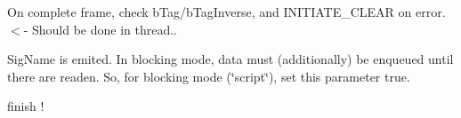 \begin{DoxyRefList}
\item[\label{todo__todo000042}%
\hypertarget{todo__todo000042}{}%
Member \hyperlink{classmdt_usbtmc_port_manager_aca42b343ae1f6a324e6e45968f03bbea}{mdt\-Usbtmc\-Port\-Manager\-:\-:from\-Thread\-New\-Frame\-Readen} ()]On complete frame, check b\-Tag/b\-Tag\-Inverse, and I\-N\-I\-T\-I\-A\-T\-E\-\_\-\-C\-L\-E\-A\-R on error. $<$-\/ Should be done in thread..  
\item[\label{todo__todo000043}%
\hypertarget{todo__todo000043}{}%
Member \hyperlink{classmdt_usbtmc_port_manager_ab1604a1c8f2e9192714d039dbf9a5158}{mdt\-Usbtmc\-Port\-Manager\-:\-:send\-Read\-Request} (bool enqueue\-Response)]Sig\-Name is emited. In blocking mode, data must (additionally) be enqueued until there are readen. So, for blocking mode (\char`\"{}script\char`\"{}), set this parameter true.  
\item[\label{todo__todo000041}%
\hypertarget{todo__todo000041}{}%
Member \hyperlink{classmdt_usbtmc_port_manager_a7bcc280bd4a26ed523832550b1e61553}{mdt\-Usbtmc\-Port\-Manager\-:\-:send\-Read\-Status\-Byte\-Request} ()]finish ! 
\end{DoxyRefList}